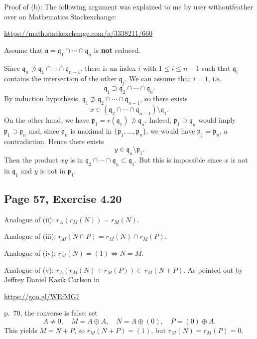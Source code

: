 \documentclass[parskip=half,fontsize=12pt]{scrartcl}%
\newcommand{\mf}{\mathfrak}
\newcommand{\ppp}{\mf p}
\newcommand{\qqq}{\mf q}
\begin{document}
Proof of (b): The following argument was explained to me by user withoutfeather over on Mathematics Stackexchange: 

\href{https://math.stackexchange.com/a/3338211/660}{https://math.stackexchange.com/a/3338211/660}

Assume that $\mathfrak{a}=\mathfrak{q}_1\cap\cdots\cap\mathfrak{q}_n$ is \textbf{not} reduced. %

Since $\mathfrak{q}_n\not\supset\mathfrak{q}_1\cap\cdots\cap\mathfrak{q}_{n-1}$, there is an index $i$ with $1\leq i\leq n-1$ such that $\mathfrak{q}_i$ contains the intersection of the other $\qqq_j$. We can assume that $i=1$, i.e. 
$$
\mathfrak{q}_1\supset\mathfrak{q}_2\cap\cdots\cap\mathfrak{q}_n.
$$ 
By induction hypothesis, $\mathfrak{q}_1\not\supset\mathfrak{q}_2\cap\cdots\cap\mathfrak{q}_{n-1}$, so there exists 
$$
x\in(\mathfrak{q}_2\cap\cdots\cap\mathfrak{q}_{n-1})\setminus\mathfrak{q}_1.
$$ 
On the other hand, we have $\mathfrak{p}_1=r(\mathfrak{q}_1)\not \supset \mathfrak{q}_n$. Indeed, $\mathfrak{p}_1\supset \mathfrak{q}_n$ would imply $\mathfrak{p}_1\supset \mathfrak{p}_n$ and, since $\mathfrak{p}_n$ is maximal in $\{\mathfrak{p}_1,\dots,\mathfrak{p}_n\}$, we would have $\mathfrak{p}_1=\mathfrak{p}_n$, a contradiction. Hence there exists 
$$
y\in\mathfrak{q}_n\setminus\mathfrak{p}_1.
$$ 
Then the product $xy$ is in $\mathfrak{q}_2\cap\cdots\cap\mathfrak{q}_n\subset\mathfrak{q}_1$. But this is impossible since $x$ is not in $\qqq_1$ and $y$ is not in $\ppp_1$. %

\subsection{Page 57, Exercise 4.20}%

Analogue of (ii): $r_A(r_M(N))=r_M(N)$. 

Analogue of (iii): $r_M(N\cap P)=r_M(N)\cap r_M(P)$. 

Analogue of (iv): $r_M(N)=(1)\iff N=M$.

Analogue of (v): $r_A(r_M(N)+r_M(P))\subset r_M(N+P)$. As pointed out by Jeffrey Daniel Kasik Carlson in\medskip 

\centerline{\href{https://goo.gl/WEfMG7}{https://goo.gl/WEfMG7}}

p.~70, the converse is false: set 
$$
A\ne0,\quad M=A\oplus A,\quad N=A\oplus(0),\quad P=(0)\oplus A.
$$ 
This yields $M=N+P$, so $r_M(N+P)=(1)$, but $r_M(N)=r_M(P)=0$. %
\end{document}
